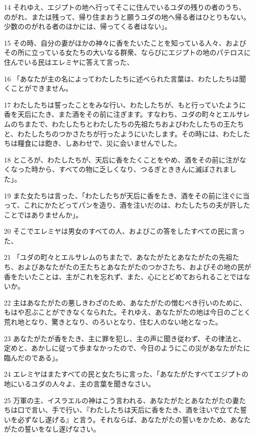 \par 14 それゆえ、エジプトの地へ行ってそこに住んでいるユダの残りの者のうち、のがれ、または残って、帰り住まおうと願うユダの地へ帰る者はひとりもない。少数ののがれる者のほかには、帰ってくる者はない」。
\par 15 その時、自分の妻がほかの神々に香をたいたことを知っている人々、およびその所に立っている女たちの大いなる群衆、ならびにエジプトの地のパテロスに住んでいる民はエレミヤに答えて言った、
\par 16 「あなたが主の名によってわたしたちに述べられた言葉は、わたしたちは聞くことができません。
\par 17 わたしたちは誓ったことをみな行い、わたしたちが、もと行っていたように香を天后にたき、また酒をその前に注ぎます。すなわち、ユダの町々とエルサレムのちまたで、わたしたちとわたしたちの先祖たちおよびわたしたちの王たちと、わたしたちのつかさたちが行ったようにいたします。その時には、わたしたちは糧食には飽き、しあわせで、災に会いませんでした。
\par 18 ところが、わたしたちが、天后に香をたくことをやめ、酒をその前に注がなくなった時から、すべての物に乏しくなり、つるぎとききんに滅ぼされました」。
\par 19 また女たちは言った、「わたしたちが天后に香をたき、酒をその前に注ぐに当って、これにかたどってパンを造り、酒を注いだのは、わたしたちの夫が許したことではありませんか」。
\par 20 そこでエレミヤは男女のすべての人、およびこの答をしたすべての民に言った、
\par 21 「ユダの町々とエルサレムのちまたで、あなたがたとあなたがたの先祖たち、およびあなたがたの王たちとあなたがたのつかさたち、およびその地の民が香をたいたことは、主がこれを忘れず、また、心にとどめておられることではないか。
\par 22 主はあなたがたの悪しきわざのため、あなたがたの憎むべき行いのために、もはや忍ぶことができなくなられた。それゆえ、あなたがたの地は今日のごとく荒れ地となり、驚きとなり、のろいとなり、住む人のない地となった。
\par 23 あなたがたが香をたき、主に罪を犯し、主の声に聞き従わず、その律法と、定めと、あかしに従って歩まなかったので、今日のようにこの災があなたがたに臨んだのである」。
\par 24 エレミヤはまたすべての民と女たちに言った、「あなたがたすべてエジプトの地にいるユダの人々よ、主の言葉を聞きなさい。
\par 25 万軍の主、イスラエルの神はこう言われる、あなたがたとあなたがたの妻たちは口で言い、手で行い、『わたしたちは天后に香をたき、酒を注いで立てた誓いを必ずなし遂げる』と言う。それならば、あなたがたの誓いをかため、あなたがたの誓いをなし遂げなさい。
